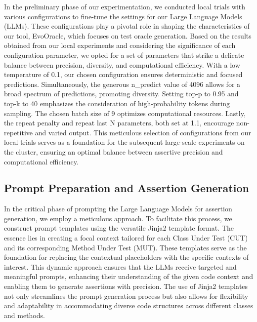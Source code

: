 In the preliminary phase of our experimentation, we conducted local trials with various configurations to fine-tune the settings for our Large Language Models (LLMs). These configurations play a pivotal role in shaping the characteristics of our tool, EvoOracle, which focuses on test oracle generation. Based on the results obtained from our local experiments and considering the significance of each configuration parameter, we opted for a set of parameters that strike a delicate balance between precision, diversity, and computational efficiency. With a low temperature of 0.1, our chosen configuration ensures deterministic and focused predictions. Simultaneously, the generous n\_predict value of 4096 allows for a broad spectrum of predictions, promoting diversity. Setting top-p to 0.95 and top-k to 40 emphasizes the consideration of high-probability tokens during sampling. The chosen batch size of 9 optimizes computational resources. Lastly, the repeat penalty and repeat last N parameters, both set at 1.1, encourage non-repetitive and varied output. This meticulous selection of configurations from our local trials serves as a foundation for the subsequent large-scale experiments on the cluster, ensuring an optimal balance between assertive precision and computational efficiency.

\vspace{0.1 cm}
\subsection{Prompt Preparation and Assertion Generation}
\label{sec:prompt_preparation}
\vspace{0.1 cm}

In the critical phase of prompting the Large Language Models for assertion generation, we employ a meticulous approach. To facilitate this process, we construct prompt templates using the versatile Jinja2\cite{noauthor_jinja_nodate}
template format. The essence lies in creating a focal context tailored for each Class Under Test (CUT) and its corresponding Method Under Test (MUT). These templates serve as the foundation for replacing the contextual placeholders with the specific contexts of interest. This dynamic approach ensures that the LLMs receive targeted and meaningful prompts, enhancing their understanding of the given code context and enabling them to generate assertions with precision. The use of Jinja2 templates not only streamlines the prompt generation process but also allows for flexibility and adaptability in accommodating diverse code structures across different classes and methods.

